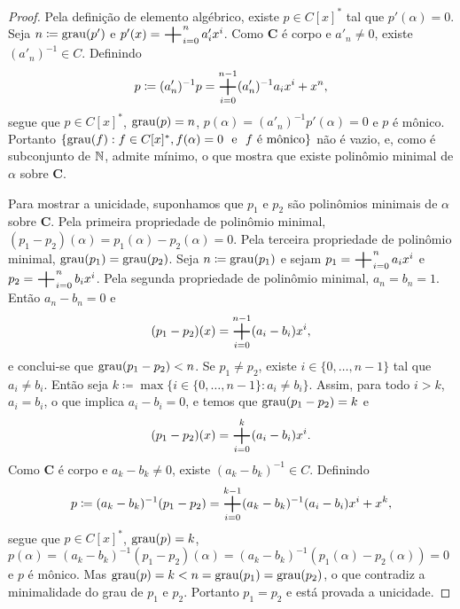 \begin{proof}
	Pela definição de elemento algébrico, existe $p \in C[x]^*$ tal que $p'(\alpha)=0$. Seja $n \coloneqq \operatorname{grau}(p')$ e $p'(x) = \bigsum_{i=0}^n a'_ix^i$. Como $\bm C$ é corpo e $a'_n \neq 0$, existe $(a'_n)^{-1} \in C$. Definindo
	\begin{equation*}
	p \coloneqq (a'_n)^{-1}p = \bigsum_{i=0}^{n-1} (a'_n)^{-1}a_ix^i + x^n,
	\end{equation*}
segue que $p \in C[x]^*$, $\operatorname{grau}(p)=n$, $p(\alpha) = (a'_n)^{-1}p'(\alpha)=0$ e $p$ é mônico. Portanto $\{\operatorname{grau}(f) : f \in C[x]^*, f(\alpha)=0 \text{\ \ e\ \ } f \text{\ é mônico}\}$ não é vazio, e, como é subconjunto de $\mathbb{N}$, admite mínimo, o que mostra que existe polinômio minimal de $\alpha$ sobre $\bm C$.

	Para mostrar a unicidade, suponhamos que $p_1$ e $p_2$ são polinômios minimais de $\alpha$ sobre $\bm C$. Pela primeira propriedade de polinômio minimal, $(p_1-p_2)(\alpha)=p_1(\alpha)-p_2(\alpha)=0$. Pela terceira propriedade de polinômio minimal, $\operatorname{grau}(p_1)=\operatorname{grau}(p_2)$. Seja $n \coloneqq \operatorname{grau}(p_1)$ e sejam $p_1 = \bigsum_{i=0}^n a_ix^i$ e $p_2 = \bigsum_{i=0}^n b_ix^i$. Pela segunda propriedade de polinômio minimal, $a_n=b_n=1$. Então $a_n-b_n=0$ e
	\begin{equation*}
	(p_1-p_2)(x) = \bigsum_{i=0}^{n-1} (a_i-b_i)x^i,
	\end{equation*}
e conclui-se que $\operatorname{grau}(p_1-p_2) < n$. Se $p_1 \neq p_2$, existe $i \in \{0,\ldots,n-1\}$ tal que $a_i \neq b_i$. Então seja $k \coloneqq \max\{i \in \{0,\ldots,n-1\} : a_i \neq b_i\}$. Assim, para todo $i > k$, $a_i = b_i$, o que implica $a_i-b_i=0$, e temos que $\operatorname{grau}(p_1-p_2)=k$ e
	\begin{equation*}
	(p_1-p_2)(x) = \bigsum_{i=0}^{k} (a_i-b_i)x^i.
	\end{equation*}
Como $\bm C$ é corpo e $a_k-b_k \neq 0$, existe $(a_k-b_k)^{-1} \in C$. Definindo
	\begin{equation*}
	p \coloneqq (a_k-b_k)^{-1}(p_1-p_2) = \bigsum_{i=0}^{k-1} (a_k-b_k)^{-1}(a_i-b_i)x^i + x^k,
	\end{equation*}
 segue que $p \in C[x]^*$, $\operatorname{grau}(p)=k$, $p(\alpha)=(a_k-b_k)^{-1}(p_1-p_2)(\alpha)=(a_k-b_k)^{-1}(p_1(\alpha)-p_2(\alpha))=0$ e $p$ é mônico. Mas $\operatorname{grau}(p) = k < n = \operatorname{grau}(p_1) = \operatorname{grau}(p_2)$, o que contradiz a minimalidade do grau de $p_1$ e $p_2$. Portanto $p_1=p_2$ e está provada a unicidade.
\end{proof}

